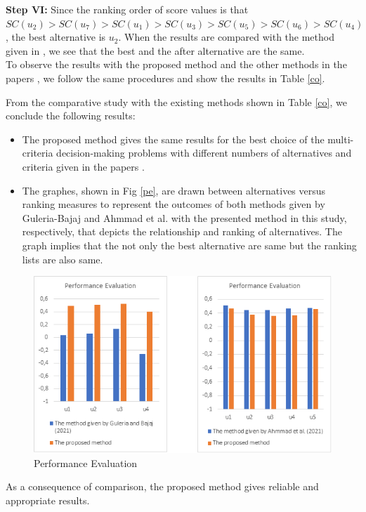\documentclass{IJFS}
\begin{document}
\textbf{Step VI:} Since the ranking order of score values is that \linebreak[4]
$SC(u_2)>SC(u_7)>SC(u_1)>SC(u_3)>SC(u_5)>SC(u_6)>SC(u_4)$, the
best alternative is $u_2$. When the results are compared with the method given in \cite{per},
we see that the best and the after alternative are the same. \\

To observe the results with the proposed method and the other methods in the papers \cite{ah, gul, yang}, we follow the same procedures and show the results in Table \ref{co}. 

From the comparative study with the existing methods shown in Table \ref{co}, we conclude the following results:
\begin{itemize}
    \item The proposed method gives the same results for the best choice of the multi-criteria decision-making problems with different numbers of alternatives and criteria given in the papers \cite{ah, gul,per, yang}.
    \item The graphes, shown in Fig \ref{pe}, are drawn between alternatives versus ranking measures to represent the outcomes of both methods given by Guleria-Bajaj \cite{gul} and Ahmmad et al. \cite{ah} with the presented method in this study, respectively, that depicts the relationship and ranking of alternatives. The graph implies that the not only the best alternative are same but the ranking lists are also same.
\end{itemize}

\begin{figure}[htbp]
    \centering
    \includegraphics[scale=1]{graf1}
    \caption{Performance Evaluation\label{pe}}
    \label{fig:my_label}
\end{figure}
As a consequence of comparison, the proposed method  gives reliable and appropriate results. 
\end{document}
